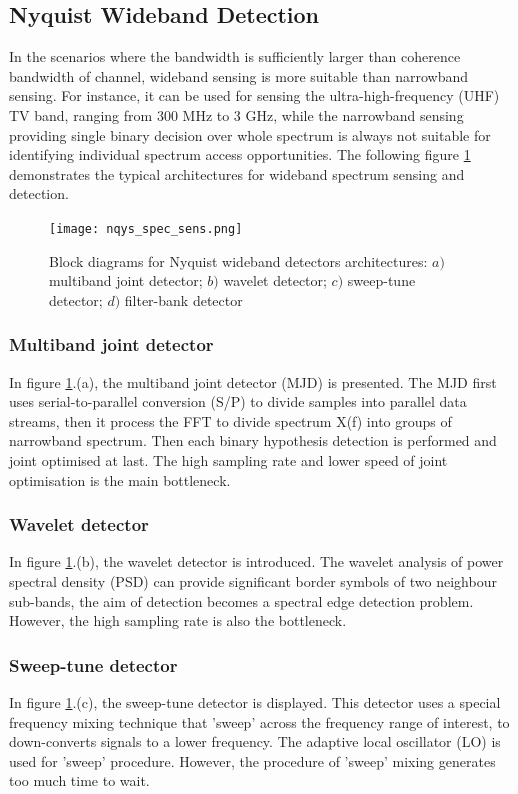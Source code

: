 \subsection{Nyquist Wideband Detection}\label{sct:wss}

In the scenarios where the bandwidth is sufficiently larger than coherence bandwidth of channel, wideband sensing is more suitable than narrowband sensing. For instance, it can be used for sensing the ultra-high-frequency (UHF) TV band, ranging from 300 MHz to 3 GHz, while the narrowband sensing providing single binary decision over whole spectrum is always not suitable for identifying individual spectrum access opportunities. The following figure \ref{nqys_spec_sens} demonstrates the typical architectures for wideband spectrum sensing and detection.

\begin{figure}
\centering
\texttt{[image: nqys\_spec\_sens.png]}
\caption{Block diagrams for Nyquist wideband detectors architectures: $a)$ multiband joint detector; $b)$ wavelet detector; $c)$ sweep-tune detector; $d)$ filter-bank detector}
\label{nqys_spec_sens}
\end{figure} 

\subsubsection{Multiband joint detector}
In figure \ref{nqys_spec_sens}.(a), the multiband joint detector (MJD) \cite{quan2009optimal} is presented. The MJD first uses serial-to-parallel conversion (S/P) to divide samples into parallel data streams, then it process the FFT to divide spectrum X(f) into groups of narrowband spectrum. Then each binary hypothesis detection is performed and joint optimised at last. The high sampling rate and lower speed of joint optimisation is the main bottleneck.

\subsubsection{Wavelet detector}
In figure \ref{nqys_spec_sens}.(b), the wavelet detector\cite{tian2006wavelet} is introduced. The wavelet analysis of power spectral density (PSD) can provide significant border symbols of two neighbour sub-bands, the aim of detection becomes a spectral edge detection problem. However, the high sampling rate is also the bottleneck.

\subsubsection{Sweep-tune detector}
In figure \ref{nqys_spec_sens}.(c), the sweep-tune detector\cite{quan2009optimal, farhang2008filter} is displayed. This detector uses a special frequency mixing technique that 'sweep' across the frequency range of interest, to down-converts signals to a lower frequency. The adaptive local oscillator (LO) is used for 'sweep' procedure. However, the procedure of 'sweep' mixing generates too much time to wait.

